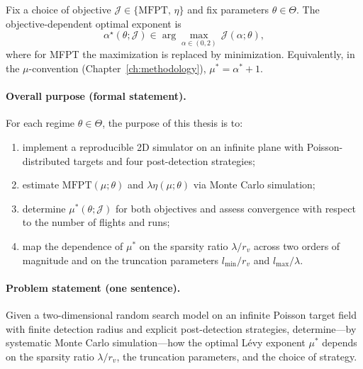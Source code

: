 \begin{Def}
Fix a choice of objective $\mathcal{J}\in\{\mathrm{MFPT},\, \eta\}$
and fix parameters $\theta\in\Theta$. The objective-dependent
optimal exponent is
\begin{equation}
    \alpha^\star(\theta;\mathcal{J}) \in \arg\max_{\alpha\in(0,2)}
    \, \mathcal{J}(\alpha;\theta),
    \label{eq:alpha_star}
\end{equation}
where for MFPT the maximization is replaced by minimization.
Equivalently, in the $\mu$-convention
(Chapter~\ref{ch:methodology}), $\mu^* = \alpha^* + 1$.
\end{Def}

\paragraph{Overall purpose (formal statement).}
For each regime $\theta\in\Theta$, the purpose of this thesis
is to:
\begin{enumerate}
    \item implement a reproducible 2D simulator on an infinite
          plane with Poisson-distributed targets and four
          post-detection strategies;
    \item estimate $\mathrm{MFPT}(\mu;\theta)$ and
          $\lambda\eta(\mu;\theta)$ via Monte Carlo simulation;
    \item determine $\mu^*(\theta;\mathcal{J})$ for both
          objectives and assess convergence with respect to the
          number of flights and runs;
    \item map the dependence of $\mu^*$ on the sparsity ratio
          $\lambda/r_v$ across two orders of magnitude and on the
          truncation parameters $l_{\min}/r_v$ and
          $l_{\max}/\lambda$.
\end{enumerate}

\paragraph{Problem statement (one sentence).}
Given a two-dimensional random search model on an infinite Poisson
target field with finite detection radius and explicit
post-detection strategies, determine---by systematic Monte Carlo
simulation---how the optimal L\'evy exponent $\mu^*$ depends on
the sparsity ratio $\lambda/r_v$, the truncation parameters, and
the choice of strategy.
